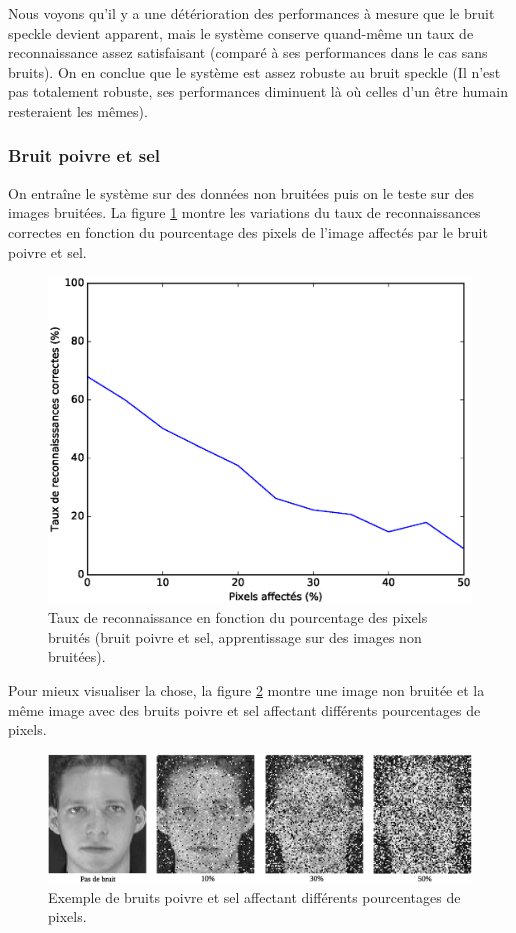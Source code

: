 Nous voyons qu'il y a une détérioration des performances à mesure que le bruit speckle
devient apparent, mais le système conserve quand-même un taux de reconnaissance assez 
satisfaisant (comparé à ses performances dans le cas sans bruits). On en conclue que le
système est assez robuste au bruit speckle (Il n'est pas totalement robuste, ses performances
diminuent là où celles d'un être humain resteraient les mêmes).

\subsubsection{Bruit poivre et sel}
On entraîne le système sur des données non bruitées puis on le teste sur des images
bruitées. La figure \ref{fig:robustness:sp:test} montre les variations du taux
de reconnaissances correctes en fonction du pourcentage des pixels de l'image affectés
par le bruit poivre et sel.
\begin{figure}[H]
    \centering
    \includegraphics[scale=0.5]{images/robustesse_sp_test}
    \caption{Taux de reconnaissance en fonction du pourcentage des pixels bruités
    (bruit poivre et sel, apprentissage sur des images non bruitées).}
    \label{fig:robustness:sp:test}
\end{figure}
Pour mieux visualiser la chose, la figure \ref{fig:robustness:sp:exemple} montre
une image non bruitée et la même image avec des bruits poivre et sel affectant 
différents pourcentages de pixels.
\begin{figure}[H]
    \centering
    \includegraphics[scale=0.44]{images/robustness_sp_exemple}
    \caption{Exemple de bruits poivre et sel affectant différents pourcentages de pixels.}
    \label{fig:robustness:sp:exemple}
\end{figure}

